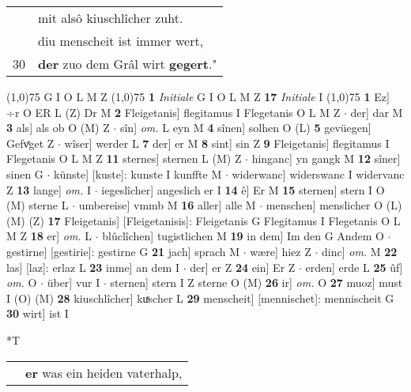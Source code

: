 \documentclass[8pt,a4paper,notitlepage]{article}
\begin{document}
\begin{table}[ht]
\begin{minipage}[t]{0.5\linewidth}
\begin{tabular}{rl}
 & mit alsô kiuschlîcher zuht.\\ 
 & diu menscheit ist immer wert,\\ 
30 & \textbf{der} zuo dem Grâl wirt \textbf{gegert}."\\ 
\end{tabular}
\scriptsize
\line(1,0){75} \newline
G I O L M Z \newline
\line(1,0){75} \newline
\textbf{1} \textit{Initiale} G I O L M Z  \textbf{17} \textit{Initiale} I  \newline
\line(1,0){75} \newline
\textbf{1} Ez] ÷r O ER L (Z) Dr M \textbf{2} Fleigetanis] flegitamus I Flegetanis O L M Z  $\cdot$ der] dar M \textbf{3} als] als ob O (M) Z  $\cdot$ sîn] \textit{om.} L eyn M \textbf{4} sînen] solhen O (L) \textbf{5} gevüegen] Gefvͤget Z  $\cdot$ wîser] werder L \textbf{7} der] er M \textbf{8} sint] sin Z \textbf{9} Fleigetanis] flegitamus I Flegetanis O L M Z \textbf{11} sternes] sternen L (M) Z  $\cdot$ hinganc] yn gangk M \textbf{12} sîner] sinen G  $\cdot$ künste] [kuste]: kunste I kunffte M  $\cdot$ widerwanc] widerswanc I widervanc Z \textbf{13} lange] \textit{om.} I  $\cdot$ iegeslîcher] angeslich er I \textbf{14} ê] Er M \textbf{15} sternen] stern I O (M) sterne L  $\cdot$ umbereise] vmmb M \textbf{16} aller] alle M  $\cdot$ menschen] menslicher O (L) (M) (Z) \textbf{17} Fleigetanis] [Fleigetanisis]: Fleigetanis G Flegitamus I Flegetanis O L M Z \textbf{18} er] \textit{om.} L  $\cdot$ blûclîchen] tugistlichen M \textbf{19} in dem] Im den G Andem O  $\cdot$ gestirne] [gestirie]: gestirne G \textbf{21} jach] sprach M  $\cdot$ wære] hiez Z  $\cdot$ dinc] \textit{om.} M \textbf{22} las] [laz]: erlaz L \textbf{23} inme] an dem I  $\cdot$ der] er Z \textbf{24} ein] Er Z  $\cdot$ erden] erde L \textbf{25} ûf] \textit{om.} O  $\cdot$ über] vur I  $\cdot$ sternen] stern I Z sterne O (M) \textbf{26} ir] \textit{om.} O \textbf{27} muoz] must I (O) (M) \textbf{28} kiuschlîcher] kuͯscher L \textbf{29} menscheit] [mennischet]: mennischeit G \textbf{30} wirt] ist I \newline
\end{minipage}
\hspace{0.5cm}
\begin{minipage}[t]{0.5\linewidth}
\small
\begin{center}*T
\end{center}
\begin{tabular}{rl}
 & \textbf{er} was ein heiden vaterhalp,\\ 

\end{tabular}
\end{minipage}
\end{table}
\end{document}
